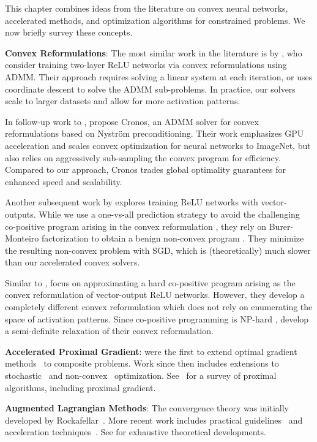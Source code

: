 
This chapter combines ideas from the literature on convex neural networks,
accelerated methods, and optimization algorithms for constrained problems.
We now briefly survey these concepts.

\textbf{Convex Reformulations}:
The most similar work in the literature is by \citet{bai2022efficient}, who
consider training two-layer ReLU networks via convex reformulations using ADMM.
Their approach requires solving a linear system at each iteration,
or uses coordinate descent to solve the ADMM sub-problems.
In practice, our solvers scale to larger datasets
and allow for more activation patterns.

In follow-up work to \citet{bai2022efficient},
\citet{feng2024chronos} propose Cronos, an ADMM solver for
convex reformulations based on Nystr\"{o}m preconditioning.
Their work emphasizes GPU acceleration and scales convex optimization for
neural networks to ImageNet, but also relies on aggressively sub-sampling the
convex program for efficiency.
Compared to our approach, Cronos trades global optimality guarantees for
enhanced speed and scalability.

Another subsequent work by \citet{sahiner2024burer} explores training ReLU
networks with vector-outputs.
While we use a one-vs-all prediction strategy to avoid the challenging
co-positive program arising in the convex reformulation
\citep{sahiner2021vector}, they rely on Burer-Monteiro factorization to obtain
a benign non-convex program \citep{burer2005low}.
They minimize the resulting non-convex problem with SGD, which is
(theoretically) much slower than our accelerated convex solvers.

Similar to \citet{sahiner2024burer}, \citet{prakhya2025convex} focus on
approximating a hard co-positive program arising as the convex reformulation 
of vector-output ReLU networks.
However, they develop a completely different convex reformulation which does
not rely on enumerating the space of activation patterns.
Since co-positive programming is NP-hard \citep{bomze200copositive},
\citet{prakhya2025convex} develop a semi-definite relaxation of
their convex reformulation.

\textbf{Accelerated Proximal Gradient}:
\citet{beck2009fista, nesterov2007proximalgradient} were the first to extend
optimal gradient methods~\citep{nesterov1983method} to composite problems.
Work since then includes extensions to
stochastic~\citep{schmidt2011convergence} and
non-convex~\citep{li2015accelerated} optimization.
See~\citet{parikh2014proximalsurvery} for a survey of proximal algorithms,
including proximal gradient.

\textbf{Augmented Lagrangian Methods}:
The convergence theory was initially developed by
Rockafellar~\citep{rockafellar1976augmented, rockafellar1976monotone}.
More recent work includes practical guidelines~\citep{birgin2014pratical} and
acceleration techniques~\citep{kang2015inexact}.
See \citet{bertsekas2014constrained} for exhaustive theoretical developments.

